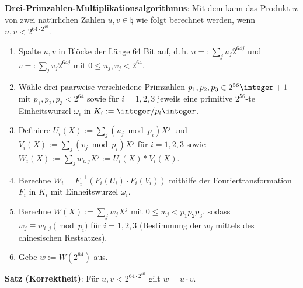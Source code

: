 \textbf{Drei-Primzahlen-Multiplikationsalgorithmus}:
Mit dem  kann das Produkt $w$ von zwei
natürlichen Zahlen $u, v \in \natural$ wie folgt berechnet werden,
wenn $u, v < 2^{64 \cdot 2^{40}}$.
\begin{enumerate}
    \item
    Spalte $u, v$ in Blöcke der Länge 64 Bit auf, d.\,h.
    $u =: \sum_j u_j 2^{64j}$ und $v =: \sum_j v_j 2^{64j}$ mit
    $0 \le u_j, v_j < 2^{64}$.
    
    \item
    Wähle drei paarweise verschiedene Primzahlen $p_1, p_2, p_3 \in 2^{56}\integer + 1$
    mit $p_1, p_2, p_3 < 2^{64}$
    sowie für $i = 1, 2, 3$ jeweils
    eine primitive $2^{56}$-te Einheitswurzel $\omega_i$ in $K_i := \integer/p_i\integer$.
    
    \item
    Definiere $U_i(X) := \sum_j (u_j \bmod p_i) X^j$ und
    $V_i(X) := \sum_j (v_j \bmod p_i) X^j$ für $i = 1, 2, 3$
    sowie $W_i(X) := \sum_j w_{i,j} X^j := U_i(X) \ast V_i(X)$.
    
    \item
    Berechne $W_i = F_i^{-1}(F_i(U_i) \cdot F_i(V_i))$ mithilfe der
    Fouriertransformation $F_i$ in $K_i$ mit Einheitswurzel $\omega_i$.
    
    \item
    Berechne $W(X) := \sum_j w_j X^j$ mit $0 \le w_j < p_1 p_2 p_3$, sodass
    $w_j \equiv w_{i,j} \pmod{p_i}$ für $i = 1, 2, 3$
    (Bestimmung der $w_j$ mittels des chinesischen Restsatzes).
    
    \item
    Gebe $w := W(2^{64})$ aus.
\end{enumerate}

\linie

\textbf{Satz (Korrektheit)}:
Für $u, v < 2^{64 \cdot 2^{40}}$ gilt $w = u \cdot v$.

